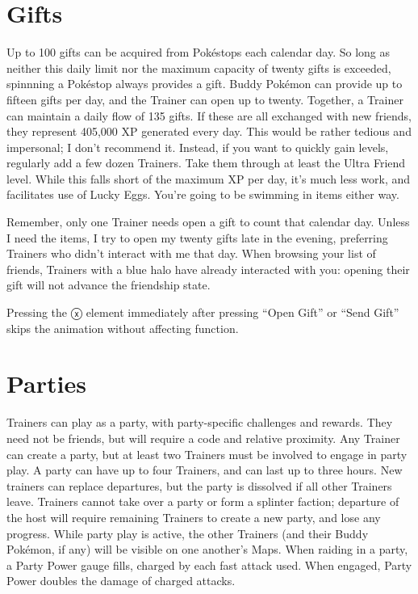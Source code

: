 \section{Gifts\label{sec:gifts}}
Up to 100 gifts can be acquired from Pokéstops each calendar day.
So long as neither this daily limit nor the maximum capacity of twenty gifts
 is exceeded, spinnning a Pokéstop always provides a gift.
Buddy Pokémon can provide up to fifteen gifts per day,
  and the Trainer can open up to twenty.
Together, a Trainer can maintain a daily flow of 135 gifts.
If these are all exchanged with new friends, they represent 405,000 XP generated every day.
This would be rather tedious and impersonal; I don't recommend it.
Instead, if you want to quickly gain levels, regularly add a few dozen Trainers.
Take them through at least the Ultra Friend level.
While this falls short of the maximum XP per day, it's much less work, and facilitates use of Lucky Eggs.
You're going to be swimming in items either way.

Remember, only one Trainer needs open a gift to count that calendar day.
Unless I need the items, I try to open my twenty gifts late in the evening,
  preferring Trainers who didn't interact with me that day.
When browsing your list of friends, Trainers with a blue halo have already interacted with you:
  opening their gift will not advance the friendship state.

\begin{tipbox}[title=A tip regarding gift UI]
Pressing the ⓧ  element immediately after pressing ``Open Gift'' or ``Send Gift''
 skips the animation without affecting function.
\end{tipbox}

\section{Parties\label{sec:parties}}
Trainers can play as a party, with party-specific challenges and rewards.
They need not be friends, but will require a code and relative proximity.
Any Trainer can create a party, but at least two Trainers must be involved to engage in party play.
A party can have up to four Trainers, and can last up to three hours.
New trainers can replace departures, but the party is dissolved if all other Trainers leave.
Trainers cannot take over a party or form a splinter faction; departure of the host will
  require remaining Trainers to create a new party, and lose any progress.
While party play is active, the other Trainers (and their Buddy Pokémon, if any)
  will be visible on one another's Maps.
When raiding in a party, a Party Power gauge fills, charged by each fast attack used.
When engaged, Party Power doubles the damage of charged attacks.

